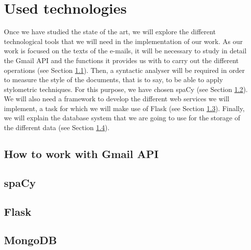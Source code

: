\chapter{Used technologies}
\label{cap:usedtech}


Once we have studied the state of the art, we will explore the different technological tools that we will need in the implementation of our work. As our work is focused on the texts of the e-mails, it will be necessary to study in detail the Gmail API and the functions it provides us with to carry out the different operations (see Section \ref{sect:gmailapitech}). Then, a syntactic analyser will be required in order to measure the style of the documents, that is to say, to be able to apply stylometric techniques. For this purpose, we have chosen spaCy (see Section \ref{sect:spacy}). We will also need a framework to develop the different web services we will implement, a task for which we will make use of Flask (see Section \ref{sect:flask}). Finally, we will explain the database system that we are going to use for the storage of the different data (see Section \ref{sect:mongo}).

\section{How to work with Gmail API}\label{sect:gmailapitech}


\section{spaCy}\label{sect:spacy}


\section{Flask}\label{sect:flask}


\section{MongoDB}\label{sect:mongo}
